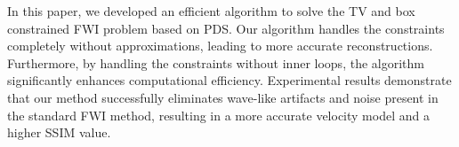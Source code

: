 In this paper, we developed an efficient algorithm to solve the TV and box constrained FWI problem based on PDS.
Our algorithm handles the constraints completely without approximations, leading to more accurate reconstructions.
Furthermore, by handling the constraints without inner loops, the algorithm significantly enhances computational efficiency.
Experimental results demonstrate that our method successfully eliminates wave-like artifacts and noise present in the standard FWI method, resulting in a more accurate velocity model and a higher SSIM value.
